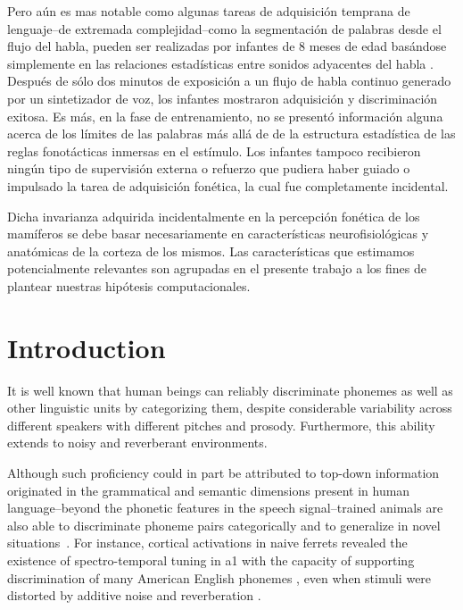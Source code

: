 {Pero aún es mas notable como algunas tareas de adquisición temprana de lenguaje--de extremada complejidad--como la segmentación de palabras desde el flujo del habla, pueden ser realizadas por infantes de 8 meses de edad basándose simplemente en las relaciones estadísticas entre sonidos adyacentes del habla \cite{Saffran1996StatisticalLB}.
Después de sólo dos minutos de exposición a un flujo de habla continuo generado por un sintetizador de voz, los infantes mostraron adquisición y discriminación exitosa. Es más, en la fase de entrenamiento, no se presentó información alguna acerca de los límites de las palabras más allá de de la estructura estadística de las reglas fonotácticas inmersas en el estímulo. Los infantes tampoco recibieron ningún tipo de supervisión externa o refuerzo que pudiera haber guiado o impulsado la tarea de adquisición fonética, la cual fue completamente incidental.

Dicha invarianza adquirida incidentalmente en la percepción fonética de los mamíferos se debe basar necesariamente en características neurofisiológicas y anatómicas de la corteza de los mismos. Las características que estimamos potencialmente relevantes son agrupadas en el presente trabajo a los fines de plantear nuestras hipótesis computacionales.
}{
\section{Introduction}

It is well known that human beings can reliably discriminate phonemes as well as other linguistic units by categorizing them, despite considerable variability across different speakers with different pitches and prosody. Furthermore, this ability extends to noisy and reverberant environments.

Although such proficiency could in part be attributed to top-down information \cite{PMID:17451657} originated in the grammatical and semantic \cite{OBLESER2011713,10.1093/cercor/bhp128} dimensions present in human language--beyond the phonetic features in the speech signal--trained animals are also able to discriminate phoneme pairs categorically and to generalize in novel situations~\cite{kuhl_1975, kuhl_1983, kluender_1998, pons_2006, hienz_1996, dent_1997, lotto_1997}. For instance, cortical activations in naive ferrets revealed the existence of spectro-temporal tuning in \gls{a1} with the capacity of supporting discrimination of many American English phonemes \cite{mesgarani_2008}, even when stimuli were distorted by additive noise and reverberation \cite{mesgarani_2014A}.

}
